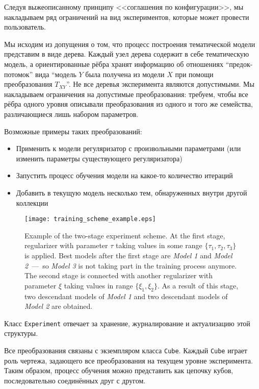 Следуя выжеописанному принципу <<соглашения по конфигурации>>, мы накладываем ряд ограничений на вид экспериментов, которые может провести пользователь.

Мы исходим из допущения о том, что процесс построения тематической модели представим в виде дерева. Каждый узел дерева содержит в себе тематическую модель, а ориентированные рёбра хранят информацию об отношениях ``предок-потомок'' вида ``модель $Y$ была получена из модели $X$ при помощи преобразования $T_{XY}$''. Не все деревья эксперимента являются допустимыми. Мы накладываем ограничения на допустимые преобразования: требуем, чтобы все рёбра одного уровня описывали преобразования из одного и того же семейства, различающиеся лишь набором параметров.  

Возможные примеры таких преобразований: 

\begin{itemize}
    \item Применить к модели регуляризатор с произвольными параметрами (или изменить параметры существующего регуляризатора)
    \item Запустить процесс обучения модели на какое-то количество итераций
    \item Добавить в текущую модель несколько тем, обнаруженных внутри другой коллекции
\end{itemize} 

\begin{figure}[t]
    \centering
    \texttt{[image: training\_scheme\_example.eps]}
    \caption{
        Example of the two-stage experiment scheme.
        At the first stage, regularizer with parameter $\tau$ taking values in some range $\{\tau_1, \tau_2, \tau_3\}$ is applied.
        Best models after the first stage are \emph{Model 1} and \emph{Model 2}~---~so \emph{Model 3} is not taking part in the training process anymore.
        The second stage is connected with another regularizer with parameter $\xi$ taking values in range $\{\xi_1, \xi_2\}$.
        As a result of this stage, two descendant models of \emph{Model 1} and two descendant models of \emph{Model 2} are obtained.
    }
\label{Training-scheme}
\end{figure} 

Класс \texttt{Experiment} отвечает за хранение, журналирование и актуализацию этой структуры.  

Все преобразования связаны с экземпляром класса \texttt{Cube}. Каждый \texttt{Cube} играет роль чертежа, задающего все преобразования на текущем уровне эксперимента. Таким образом, процесс обучения можно представить как цепочку кубов, последовательно соединённых друг с другом.  

